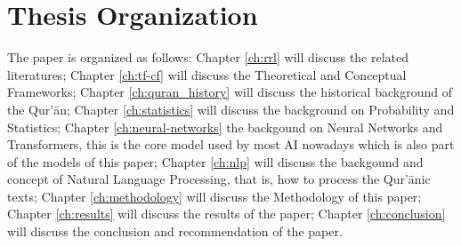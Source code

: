 \section{Thesis Organization}
The paper is organized as follows: Chapter \ref{ch:rrl} will discuss the related literatures; Chapter \ref{ch:tf-cf} will discuss the Theoretical and Conceptual Frameworks; Chapter \ref{ch:quran_history} will discuss the historical background of the Qur'\=an; Chapter \ref{ch:statistics} will discuss the background on Probability and Statistics; Chapter \ref{ch:neural-networks} the backgound on Neural Networks and Transformers, this is the core model used by most AI nowadays which is also part of the models of this paper; Chapter \ref{ch:nlp} will discuss the backgound and concept of Natural Language Processing, that is, how to process the Qur'\=anic texts; Chapter \ref{ch:methodology} will discuss the Methodology of this paper; Chapter \ref{ch:results} will discuss the results of the paper; Chapter \ref{ch:conclusion} will discuss the conclusion and recommendation of the paper.
